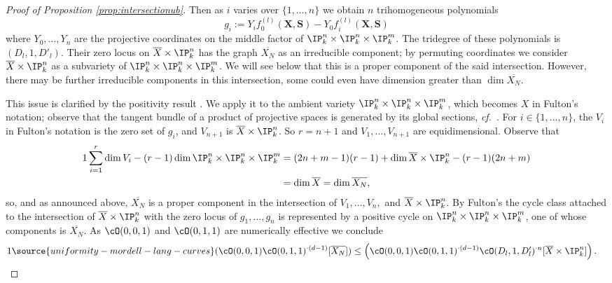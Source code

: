 \begin{proof}[Proof of Proposition \ref{prop:intersectionub}]
Then as $i$ varies over $\{1,\ldots,n\}$ we obtain $n$ trihomogeneous
polynomials
\begin{equation*}
g_i :=  Y_i f_0^{(l)}(\mathbf{X},\mathbf{S}) - Y_0   f_i^{(l)}(\mathbf{X},\mathbf{S})
\end{equation*}
where $Y_0,\ldots,Y_n$ are the projective coordinates on the middle factor of $\IP_k^n\times\IP_k^n\times\IP_k^m$.
The tridegree of these polynomials is $(D_l,1,D'_l)$. %
Their zero locus on $\overline X\times\IP_k^n$ has the graph
$\overline{X_N}$ as an irreducible component;
by permuting coordinates we consider $\overline X\times\IP_k^n$ as a
subvariety of $\IP_k^n\times\IP_k^n\times\IP_k^m$.
We will see below that this is a proper component of the said
intersection.
However, there may be further irreducible components in this
intersection,  some could even have dimension greater than $\dim
\overline{X_N}$.

This issue is clarified by the positivity result \cite[Corollary
12.2.(a)]{Fulton}. We apply it to the ambient
variety
$\IP_k^n\times\IP_k^n\times\IP_k^m$, which becomes $X$ in Fulton's
notation; observe that
 the tangent bundle of a product of projective spaces
is generated by its global sections, \textit{cf.}~\cite[Examples 12.2.1.(a) and
(c)]{Fulton}. For $i\in\{1,\ldots,n\}$, the $V_i$ in Fulton's notation
is the zero set of $g_i$, and $V_{n+1}$ is
$\overline{X} \times \IP_k^n$. So $r=n+1$ and $V_1,\ldots,V_{n+1}$ are
equidimensional.
Observe that
\begin{alignat*}1
  \sum_{i=1}^{r} \dim V_i  - (r-1) \dim
  \IP_k^n\times\IP_k^n\times\IP_k^m
  &= (2n+m-1)(r-1) + \dim\overline{X}\times\IP_k^n
  - (r-1)(2n+m)
  \\
  &= \dim \overline{X} = \dim \overline{X_N},
\end{alignat*}
so, and as announced above, $\overline{X_N}$ is a proper component in the intersection of
$V_1,\ldots,V_n,$ and $\overline{X} \times \IP_k^n$.
By Fulton's \cite[Corollary
12.2.(a)]{Fulton} the  cycle class
attached to the intersection of $\overline X\times\IP_k^n$ with the zero
locus of $g_1,\ldots,g_n$
is represented by a positive cycle on
$\IP_k^n\times\IP_k^n\times\IP_k^m$, one of
whose components is $\overline{X_N}$. As $\cO(0,0,1)$ and $\cO(0,1,1)$
are numerically effective we conclude
\begin{alignat}1
  \label{eq:inupperboundconclusion1}
\source{uniformity-mordell-lang-curves}
  (\cO(0,0,1)  \cO(0,1,1)^{\cdot (d-1)}  [\overline{X_N}])
  &\le
  \left(\cO(0,0,1)  \cO(0,1,1)^{\cdot (d-1)}
  \cO(D_l,1,D'_l)^{\cdot n}  [\overline{X} \times\IP_k^n]\right).
\end{alignat}


\end{proof}
